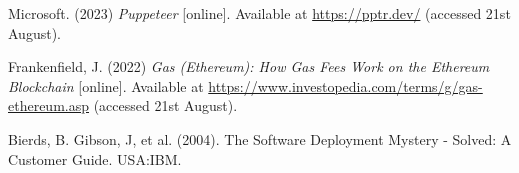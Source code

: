  \noindent [TODO6] Microsoft. (2023) \textit{Puppeteer} [online]. Available at \url{https://pptr.dev/} (accessed 21st August).
 \vspace{0.2cm}

 \noindent [TODO7] Frankenfield, J. (2022) \textit{Gas (Ethereum): How Gas Fees Work on the Ethereum Blockchain} [online]. Available at \url{https://www.investopedia.com/terms/g/gas-ethereum.asp} (accessed 21st August).
 \vspace{0.2cm}

 \noindent [TODO8] Bierds, B. Gibson, J, et al. (2004). The Software Deployment Mystery - Solved: A Customer Guide. USA:IBM.
 \vspace{0.2cm}

\newpage
